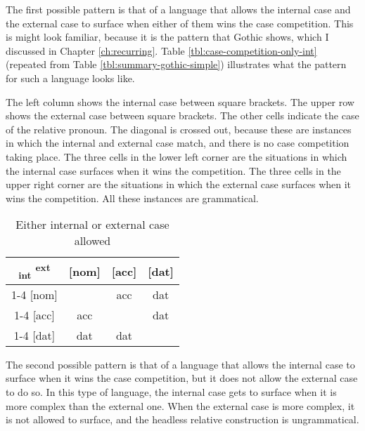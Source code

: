 The first possible pattern is that of a language that allows the internal case and the external case to surface when either of them wins the case competition. This is might look familiar, because it is the pattern that Gothic shows, which I discussed in Chapter \ref{ch:recurring}. Table \ref{tbl:case-competition-only-int} (repeated from Table \ref{tbl:summary-gothic-simple}) illustrates what the pattern for such a language looks like.

The left column shows the internal case between square brackets. The upper row shows the external case between square brackets. The other cells indicate the case of the relative pronoun. The diagonal is crossed out, because these are instances in which the internal and external case match, and there is no case competition taking place.
The three cells in the lower left corner are the situations in which the internal case surfaces when it wins the competition. The three cells in the upper right corner are the situations in which the external case surfaces when it wins the competition. All these instances are grammatical.

\begin{table}[H]
  \center
  \caption{Either internal or external case allowed}
  \begin{tabular}{c|c|c|c}
    \toprule
    \textsubscript{\ac{int}} \textsuperscript{\ac{ext}}
           & [\ac{nom}]
           & [\ac{acc}]
           & [\ac{dat}]
           \\ \cmidrule{1-4}
       [\ac{nom}]
           & \xcancel{\phantom{xx}}
           & \ac{acc}
           & \ac{dat}
           \\ \cmidrule{1-4}
       [\ac{acc}]
           & \ac{acc}
           & \xcancel{\phantom{xx}}
           & \ac{dat}
           \\ \cmidrule{1-4}
       [\ac{dat}]
           & \ac{dat}
           & \ac{dat}
           & \xcancel{\phantom{xx}}
           \\
     \bottomrule
  \end{tabular}
    \label{tbl:case-competition-int-ext}
\end{table}

The second possible pattern is that of a language that allows the internal case to surface when it wins the case competition, but it does not allow the external case to do so. In this type of language, the internal case gets to surface when it is more complex than the external one. When the external case is more complex, it is not allowed to surface, and the headless relative construction is ungrammatical.

